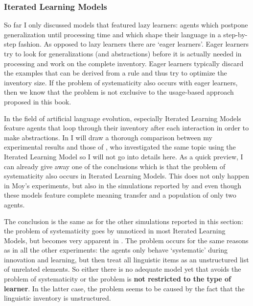 \subsubsection{Iterated Learning Models}
 So far I only discussed models that featured lazy learners: agents which postpone generalization until processing time and which shape their language in a step-by-step fashion. As opposed to lazy learners there are `eager learners'. Eager learners try to look for generalizations (and abstractions) before it is actually needed in processing and work on the complete inventory. Eager learners typically discard the examples that can be derived from a rule and thus try to optimize the inventory size. If the problem of systematicity also occurs with eager learners, then we know that the problem is not exclusive to the usage-based approach proposed in this book. 

In the field of artificial language evolution, especially Iterated Learning Models feature agents that loop through their inventory after each interaction in order to make abstractions. In  I will draw a thorough comparison between my experimental results and those of \citet{moy06case}, who investigated the same topic using the Iterated Learning Model so I will not go into details here. As a quick preview, I can already give away one of the conclusions which is that the problem of systematicity also occurs in Iterated Learning Models. This does not only happen in Moy's experiments, but also in the simulations reported by \citet{kirby00syntax} and \citet{smith03iterated} even though these models feature complete meaning transfer and a population of only two agents.

The conclusion is the same as for the other simulations reported in this section: the problem of systematicity goes by unnoticed in most Iterated Learning Models, but becomes very apparent in \citet{moy06case}. The problem occurs for the same reasons as in all the other experiments: the agents only behave `systematic' during innovation and learning, but then treat all linguistic items as an unstructured list of unrelated elements. So either there is no adequate model yet that avoids the problem of systematicity or the problem is {\bfseries not restricted to the type of learner}. In the latter case, the problem seems to be caused by the fact that the linguistic inventory is unstructured.


